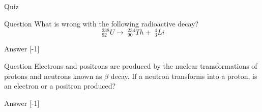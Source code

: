 %
%

{
\problemslide

\begin{frame}{Quiz}

\begin{blockexmplque}{Question}
  What is wrong with the following radioactive decay?
  \begin{equation*}
    \;^{238}_{92}U \rightarrow \;^{234}_{90}Th + \;^{4}_{3}Li
  \end{equation*}

\end{blockexmplque}

\begin{blockexmplans}{Answer}
\noindent
\scalebox{1}[-1]{
}
\end{blockexmplans}


\begin{blockexmplque}{Question}
  Electrons and positrons are produced by the nuclear transformations of
  protons and neutrons known as $\beta$ decay. If a neutron transforms
  into a proton, is an electron or a positron produced?

\end{blockexmplque}

\begin{blockexmplans}{Answer}
\noindent
\scalebox{1}[-1]{
}
\end{blockexmplans}



\end{frame}

} %


%
%
%

